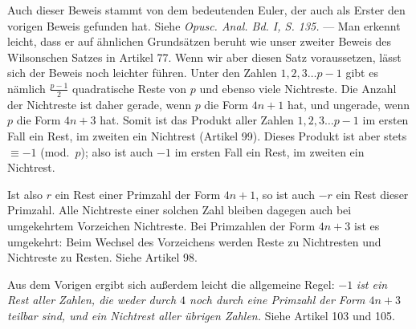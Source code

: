 Auch dieser Beweis stammt von dem bedeutenden Euler, der auch als Erster den vorigen Beweis gefunden hat. Siehe \emph{Opusc. Anal. Bd. I, S. 135.} --- Man erkennt leicht, dass er auf ähnlichen Grundsätzen beruht wie unser zweiter Beweis des Wilsonschen Satzes in Artikel 77. Wenn wir aber diesen Satz voraussetzen, lässt sich der Beweis noch leichter führen. Unter den Zahlen $1,2,3\ldots p-1$ gibt es nämlich $\frac{p-1}{2}$ quadratische Reste von $p$ und ebenso viele Nichtreste. Die Anzahl der Nichtreste ist daher gerade, wenn $p$ die Form $4n+1$ hat, und ungerade, wenn $p$ die Form $4n+3$ hat. Somit ist das Produkt aller Zahlen $1,2,3\ldots p-1$ im ersten Fall ein Rest, im zweiten ein Nichtrest (Artikel 99). Dieses Produkt ist aber stets $\equiv-1$ (mod.~$p$); also ist auch $-1$ im ersten Fall ein Rest, im zweiten ein Nichtrest.

Ist also $r$ ein Rest einer Primzahl der Form $4n+1$, so ist auch $-r$ ein Rest dieser Primzahl. Alle Nichtreste einer solchen Zahl bleiben dagegen auch bei umgekehrtem Vorzeichen Nichtreste. Bei Primzahlen der Form $4n+3$ ist es umgekehrt: Beim Wechsel des Vorzeichens werden Reste zu Nichtresten und Nichtreste zu Resten. Siehe Artikel 98.

Aus dem Vorigen ergibt sich außerdem leicht die allgemeine Regel: $-1$ \emph{ist ein Rest aller Zahlen, die weder durch $4$ noch durch eine Primzahl der Form $4n+3$ teilbar sind, und ein Nichtrest aller übrigen Zahlen.} Siehe Artikel 103 und 105.
